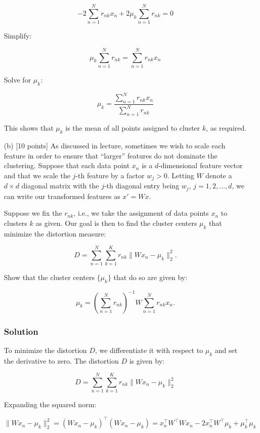 \documentclass{article}
\begin{document}
\begin{enumerate}
    \[
    -2 \sum_{n=1}^N r_{nk} x_n + 2 \mu_k \sum_{n=1}^N r_{nk} = 0
    \]

    Simplify:

    \[
    \mu_k \sum_{n=1}^N r_{nk} = \sum_{n=1}^N r_{nk} x_n
    \]

    Solve for \(\mu_k\):

    \[
    \mu_k = \frac{\sum_{n=1}^N r_{nk} x_n}{\sum_{n=1}^N r_{nk}}
    \]

    This shows that \(\mu_k\) is the mean of all points assigned to cluster \( k \), as required.



    \item [(b)] [10 points] As discussed in lecture, sometimes we wish to scale each feature in order to ensure that ``larger'' features do not dominate the clustering. Suppose that each data point $x_n$ is a $d$-dimensional feature vector and that we scale the $j$-th feature by a factor $w_j > 0$. Letting $W$ denote a $d \times d$ diagonal matrix with the $j$-th diagonal entry being $w_j, \, j = 1, 2, \ldots, d$, we can write our transformed features as $x' = Wx$.

    Suppose we fix the $r_{nk}$, i.e., we take the assignment of data points $x_n$ to clusters $k$ as given. Our goal is then to find the cluster centers $\mu_k$ that minimize the distortion measure:
    

\[
    D = \sum_{n=1}^N \sum_{k=1}^K r_{nk} \|Wx_n - \mu_k\|_2^2.
    \]



    Show that the cluster centers $\{\mu_k\}$ that do so are given by:
    

\[
    \mu_k = \left( \sum_{n=1}^N r_{nk} \right)^{-1} W \sum_{n=1}^N r_{nk} x_n.
    \]

    \subsubsection*{Solution}

    To minimize the distortion \( D \), we differentiate it with respect to \(\mu_k\) and set the derivative to zero. The distortion \( D \) is given by:

    \[
    D = \sum_{n=1}^N \sum_{k=1}^K r_{nk} \|Wx_n - \mu_k\|_2^2
    \]

    Expanding the squared norm:

    \[
    \|Wx_n - \mu_k\|_2^2 = (Wx_n - \mu_k)^\top (Wx_n - \mu_k) = x_n^\top W^\top W x_n - 2 x_n^\top W^\top \mu_k + \mu_k^\top \mu_k
    \]


\end{enumerate}
\end{document}
